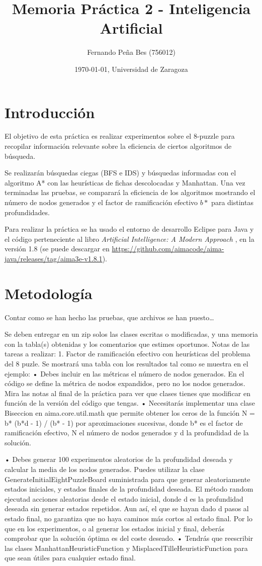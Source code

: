 \documentclass{article}
\author{Fernando Peña Bes (756012)}
\title{Memoria Práctica 2 - Inteligencia Artificial}
\date{\today, Universidad de Zaragoza}
\begin{document}
\maketitle
\section{Introducción} 
El objetivo de esta práctica es realizar experimentos sobre el 8-puzzle para recopilar información relevante sobre la eficiencia de ciertos algoritmos de búsqueda.

Se realizarán búsquedas ciegas (BFS e IDS) y búsquedas informadas con el algoritmo A* con las heurísticas de fichas descolocadas y Manhattan. Una vez terminadas las pruebas, se comparará la eficiencia de los algoritmos mostrando el número de nodos generados y el factor de ramificación efectivo $b*$ para distintas profundidades.

Para realizar la práctica se ha usado el entorno de desarrollo Eclipse para Java y el código perteneciente al libro \textit{Artificial Intelligence: A Modern Approach} \cite{AIMA}, en la versión 1.8 (se puede descargar en \url{https://github.com/aimacode/aima-java/releases/tag/aima3e-v1.8.1}).

\section{Metodología}
Contar como se han hecho las pruebas, que archivos se han puesto\dots

Se deben entregar en un zip solos las clases escritas o modificadas, y una memoria con la tabla(s) obtenidas y los comentarios que estimes oportunos.
Notas de las tareas a realizar:
1. Factor de ramificación efectivo con heurísticas del problema del 8 puzle. Se mostrará una tabla con los resultados tal como se muestra en el ejemplo:
• Debes incluir en las métricas el número de nodos generados. En el código se define la métrica de nodos expandidos, pero no los nodos generados. Mira las notas al final de la práctica para ver que clases tienes que modificar en función de la versión del código que tengas.
• Necesitarás implementar una clase Biseccion en aima.core.util.math que permite obtener los ceros de la función N = b* (b*d - 1) / (b* - 1) por aproximaciones sucesivas, donde b* es el factor de ramificación efectivo, N el número de nodos generados y d la profundidad de la solución.
 
 • Debes generar 100 experimentos aleatorios de la profundidad deseada y calcular la media de los nodos generados. Puedes utilizar la clase GenerateInitialEightPuzzleBoard suministrada para que generar aleatoriamente estados iniciales, y estados finales de la profundidad deseada. El método random ejecutad acciones aleatorias desde el estado inicial, donde d es la profundidad deseada sin generar estados repetidos. Aun así, el que se hayan dado d pasos al estado final, no garantiza que no haya caminos más cortos al estado final. Por lo que en los experimentos, o al generar los estados inicial y final, deberás comprobar que la solución óptima es del coste deseado.
• Tendrás que reescribir las clases ManhattanHeuristicFunction y MisplacedTilleHeuristicFunction para que sean útiles para cualquier estado final.
\end{document}
